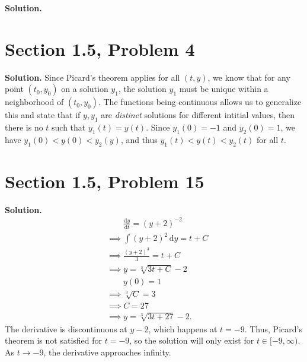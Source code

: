 \documentclass[11pt, letterpaper]{report}
\newenvironment{soln}[1][]{\noindent\textbf{Solution. }}{\hfill\qedsymbol}
\begin{document}
\begin{soln}
\begin{center}
	\end{center}
\end{soln}
\section*{Section 1.5, Problem 4}
\begin{soln}
	Since Picard's theorem applies for all $(t,y)$, we know that for any point $(t_0,y_0)$ on a solution $y_1$, the solution $y_1$ must be unique within a neighborhood of $(t_0,y_0)$. The functions being continuous allows us to generalize this and state that if $y,y_1$ are \emph{distinct} solutions for different intitial values, then there is no $t$ such that $y_1(t)=y(t)$. Since $y_1(0)=-1$ and $y_2(0)=1$, we have $y_1(0)<y(0)<y_2(y)$, and thus $y_1(t)<y(t)<y_2(t)$ for all $t$.
\end{soln}
\section*{Section 1.5, Problem 15}
\begin{soln}
	\begin{align*}
		&\qquad \frac{\mathrm{d}y}{\mathrm{d}t} =\left( y+2 \right) ^{-2}\\
		&\implies \int \left( y+2 \right) ^{2} \,\mathrm{d} y=t+C\\
		&\implies \frac{\left( y+2 \right) ^3}{3}=t+C\\
		&\implies y=\sqrt[3]{3t+C}-2 \\
		&\qquad y(0)=1\\
		&\implies \sqrt[3]{C}=3\\
		&\implies C=27\\
		&\implies y=\sqrt[3]{3t+27}-2 
	.\end{align*}
	The derivative is discontinuous at $y-2$, which happens at $t=-9$. Thus, Picard's theorem is not satisfied for $t=-9$, so the solution will only exist for $t\in[-9,\infty)$. As $t\to -9$, the derivative approaches infinity.
\end{soln}
\end{document}
